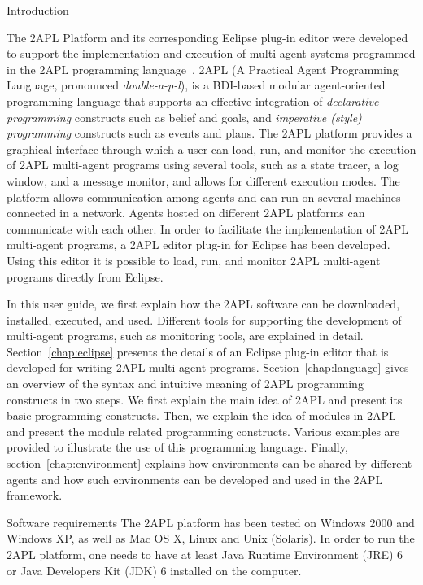 \begin{chapter}{Introduction}
\label{chap:introduction}

The 2APL Platform and its corresponding Eclipse plug-in editor were
developed to support the implementation and execution of multi-agent
systems programmed in the 2APL programming
language~\cite{Dastani:08a,D-RULECHP09,CLIMA09}. 2APL (A Practical
Agent Programming Language, pronounced \emph{double-a-p-l}), is a
BDI-based modular agent-oriented programming language that supports
an effective integration of \emph{declarative programming}
constructs such as belief and goals, and \emph{imperative (style)
programming} constructs such as events and plans. The 2APL platform
provides a graphical interface through which a user can load, run,
and monitor the execution of 2APL multi-agent programs using several
tools, such as a state tracer, a log window, and a message monitor,
and allows for different execution modes. The platform allows
communication among agents and can run on several machines connected
in a network. Agents hosted on different 2APL platforms can
communicate with each other. In order to facilitate the
implementation of 2APL multi-agent programs, a 2APL editor plug-in
for Eclipse has been developed. Using this editor it is possible to
load, run, and monitor 2APL multi-agent programs directly from
Eclipse.

In this user guide, we first explain how the 2APL software can be
downloaded, installed, executed, and used. Different tools for
supporting the development of multi-agent programs, such as
monitoring tools, are explained in detail.
Section~\ref{chap:eclipse} presents the details of an Eclipse
plug-in editor that is developed for writing 2APL multi-agent
programs. Section~\ref{chap:language} gives an overview of the
syntax and intuitive meaning of 2APL programming constructs in two
steps. We first explain the main idea of 2APL and present its basic
programming constructs. Then, we explain the idea of modules in 2APL
and present the module related programming constructs. Various
examples are provided to illustrate the use of this programming
language. Finally, section~\ref{chap:environment} explains how
environments can be shared by different agents and how such
environments can be developed and used in the 2APL framework.

\begin{section}{Software requirements}
The 2APL platform has been tested on Windows 2000 and Windows XP, as
well as Mac OS X, Linux and Unix (Solaris). In order to run the 2APL
platform, one needs to have at least Java Runtime Environment (JRE)
6 or Java Developers Kit (JDK) 6 installed on the computer.
\end{section}


\end{chapter}
